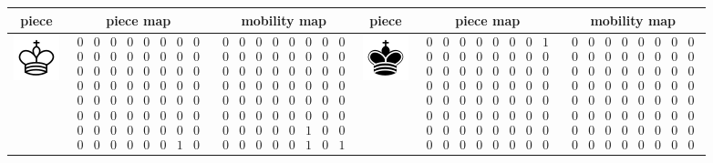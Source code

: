 \begin{table}[]
\centering
\begin{tabular}{c c c | c c c}
\toprule
\textbf{piece} & \textbf{piece map} & \textbf{mobility map} & \textbf{piece} & \textbf{piece map} & \textbf{mobility map} \\
\midrule
\includegraphics[scale=0.5]{fig/pieces/K} & 
$ \begin{smallmatrix} 0&0&0&0&0&0&0&0\\0&0&0&0&0&0&0&0\\0&0&0&0&0&0&0&0\\0&0&0&0&0&0&0&0\\0&0&0&0&0&0&0&0\\0&0&0&0&0&0&0&0\\0&0&0&0&0&0&0&0\\0&0&0&0&0&0&1&0 \end{smallmatrix} $ &  $\begin{smallmatrix}0&0&0&0&0&0&0&0\\0&0&0&0&0&0&0&0\\0&0&0&0&0&0&0&0\\0&0&0&0&0&0&0&0\\0&0&0&0&0&0&0&0\\0&0&0&0&0&0&0&0\\0&0&0&0&0&1&0&0\\0&0&0&0&0&1&0&1\end{smallmatrix}$  &

\includegraphics[scale=0.5]{fig/pieces/k} &
$\begin{smallmatrix}0&0&0&0&0&0&0&1\\0&0&0&0&0&0&0&0\\0&0&0&0&0&0&0&0\\0&0&0&0&0&0&0&0\\0&0&0&0&0&0&0&0\\0&0&0&0&0&0&0&0\\0&0&0&0&0&0&0&0\\0&0&0&0&0&0&0&0\end{smallmatrix}$ &
$\begin{smallmatrix}0&0&0&0&0&0&0&0\\0&0&0&0&0&0&0&0\\0&0&0&0&0&0&0&0\\0&0&0&0&0&0&0&0\\0&0&0&0&0&0&0&0\\0&0&0&0&0&0&0&0\\0&0&0&0&0&0&0&0\\0&0&0&0&0&0&0&0\end{smallmatrix}$ \\ [1cm]


\end{tabular}
\end{table}
